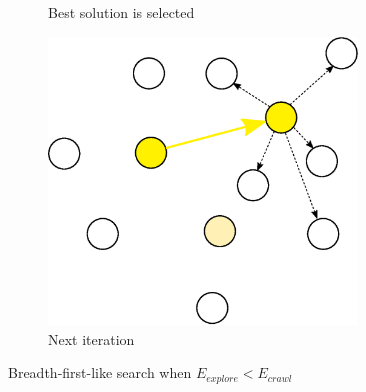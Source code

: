 \documentclass[english,a4paper,twoside]{ppfcmthesis}
\begin{document}
\begin{figure}
\begin{subfigure}{0.3\textwidth}
    \caption{Best solution is selected}
  \end{subfigure}
  \begin{subfigure}{0.3\textwidth}
    \centering
    \includegraphics[width=0.9\textwidth]{algorithm/metaheuristic/bfs3.eps}
    \caption{Next iteration}
  \end{subfigure}

  \caption{Breadth-first-like search when $E_{explore} < E_{crawl}$}
  \label{figure:m_explore_bfs}
\end{figure}
\end{document}
